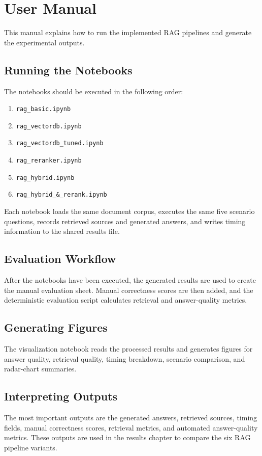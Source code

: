 \newpage
\section*{User Manual}

This manual explains how to run the implemented RAG pipelines and generate the experimental outputs.

\subsection*{Running the Notebooks}
The notebooks should be executed in the following order:
\begin{enumerate}
    \item \texttt{rag\_basic.ipynb}
    \item \texttt{rag\_vectordb.ipynb}
    \item \texttt{rag\_vectordb\_tuned.ipynb}
    \item \texttt{rag\_reranker.ipynb}
    \item \texttt{rag\_hybrid.ipynb}
    \item \texttt{rag\_hybrid\_\&\_rerank.ipynb}
\end{enumerate}

Each notebook loads the same document corpus, executes the same five scenario questions, records retrieved sources and generated answers, and writes timing information to the shared results file.

\subsection*{Evaluation Workflow}
After the notebooks have been executed, the generated results are used to create the manual evaluation sheet. Manual correctness scores are then added, and the deterministic evaluation script calculates retrieval and answer-quality metrics.

\subsection*{Generating Figures}
The visualization notebook reads the processed results and generates figures for answer quality, retrieval quality, timing breakdown, scenario comparison, and radar-chart summaries.

\subsection*{Interpreting Outputs}
The most important outputs are the generated answers, retrieved sources, timing fields, manual correctness scores, retrieval metrics, and automated answer-quality metrics. These outputs are used in the results chapter to compare the six RAG pipeline variants.

